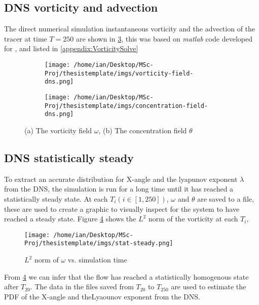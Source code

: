 \subsection{DNS vorticity and advection} \label{sec:l_pdf1}
The direct numerical simulation instantaneous vorticity and the advection of the tracer at time $T = 250$ are shown in \ref{fig:omega_theta}, this was based on \textit{matlab} code developed for \cite{main}, and 
listed in \ref{appendix:VorticitySolve}

\begin{figure}[ht]
\begin{subfigure}{.5\textwidth}
  \centering
  \texttt{[image: /home/ian/Desktop/MSc-Proj/thesistemplate/imgs/vorticity-field-dns.png]}
  \caption{}
  \label{fig:sub1_omega_theta}
\end{subfigure}
\begin{subfigure}{.5\textwidth}
  \centering
  \texttt{[image: /home/ian/Desktop/MSc-Proj/thesistemplate/imgs/concentration-field-dns.png]}
  \caption{}
  \label{fig:sub2_omega_theta}
\end{subfigure}
\caption{(a) The vorticity field $\omega$, (b) The concentration field $\theta$}
\label{fig:omega_theta}
\end{figure}



\subsection{DNS statistically steady} \label{sec:l_pdf2}
To extract an accurate distribution for X-angle and the lyapunov exponent $\lambda$ from the DNS, the simulation is run for a long time until it has reached a statistically steady state. 
At each $T_{i} (i \in [1,250])$, $\omega$ and $\theta$ are saved to a file, these are used to create a graphic to visually inspect for the system to have reached a steady state.
Figure \ref{fig:stat-steady} shows the $L^{2}$ norm of the vorticity at each $T_{i}$, 
\begin{figure} 
  \centering
  \texttt{[image: /home/ian/Desktop/MSc-Proj/thesistemplate/imgs/stat-steady.png]}
  \caption{$L^2$ norm of $\omega$ vs. simulation time}
  \label{fig:sub1_steady}
\label{fig:stat-steady}
\end{figure}

From \ref{fig:stat-steady} we can infer that the flow has reached a statistically homogenous state after $T_{20}$. The data in the files saved from $T_{20}$ to $T_{250}$ are used to 
estimate the PDF of the X-angle and theLyaounov exponent from the DNS.
